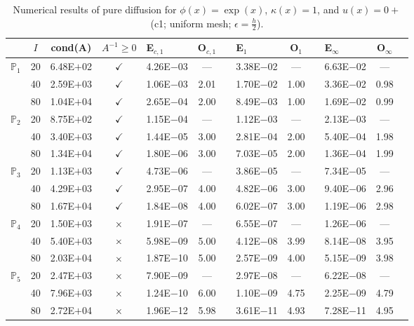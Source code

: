 \begin{table}[H]
\centering
\caption{Numerical results of pure diffusion for $\phi(x)=\exp(x)$, $\kappa(x)=1$, and $u(x)=0+$ (c1; uniform mesh; $\epsilon=\frac{h}{2}$).}
\begin{tabular}{@{}l c c c l c c l c c l c c@{}}
\toprule
 & $I$ & cond(A) & $A^{-1}\geq 0$ &  E$_{c,1}$ & O$_{c,1}$ && E$_1$ & O$_1$ && E$_{\infty}$ & O$_{\infty}$\\
\midrule
\multirow{3}{*}{$\mathbb{P}_{1}$}
 & 20 & 6.48E$+$02 & $\checkmark$ & 4.26E$-$03 & --- && 3.38E$-$02 & --- && 6.63E$-$02 & ---\\
 & 40 & 2.59E$+$03 & $\checkmark$ & 1.06E$-$03 & 2.01 && 1.70E$-$02 & 1.00 && 3.36E$-$02 & 0.98\\
 & 80 & 1.04E$+$04 & $\checkmark$ & 2.65E$-$04 & 2.00 && 8.49E$-$03 & 1.00 && 1.69E$-$02 & 0.99\\
\midrule
\multirow{3}{*}{$\mathbb{P}_{2}$}
 & 20 & 8.75E$+$02 & $\checkmark$ & 1.15E$-$04 & --- && 1.12E$-$03 & --- && 2.13E$-$03 & ---\\
 & 40 & 3.40E$+$03 & $\checkmark$ & 1.44E$-$05 & 3.00 && 2.81E$-$04 & 2.00 && 5.40E$-$04 & 1.98\\
 & 80 & 1.34E$+$04 & $\checkmark$ & 1.80E$-$06 & 3.00 && 7.03E$-$05 & 2.00 && 1.36E$-$04 & 1.99\\
\midrule
\multirow{3}{*}{$\mathbb{P}_{3}$}
 & 20 & 1.13E$+$03 & $\checkmark$ & 4.73E$-$06 & --- && 3.86E$-$05 & --- && 7.34E$-$05 & ---\\
 & 40 & 4.29E$+$03 & $\checkmark$ & 2.95E$-$07 & 4.00 && 4.82E$-$06 & 3.00 && 9.40E$-$06 & 2.96\\
 & 80 & 1.67E$+$04 & $\checkmark$ & 1.84E$-$08 & 4.00 && 6.02E$-$07 & 3.00 && 1.19E$-$06 & 2.98\\
\midrule
\multirow{3}{*}{$\mathbb{P}_{4}$}
 & 20 & 1.50E$+$03 & $\times$ & 1.91E$-$07 & --- && 6.55E$-$07 & --- && 1.26E$-$06 & ---\\
 & 40 & 5.40E$+$03 & $\times$ & 5.98E$-$09 & 5.00 && 4.12E$-$08 & 3.99 && 8.14E$-$08 & 3.95\\
 & 80 & 2.03E$+$04 & $\times$ & 1.87E$-$10 & 5.00 && 2.57E$-$09 & 4.00 && 5.15E$-$09 & 3.98\\
\midrule
\multirow{3}{*}{$\mathbb{P}_{5}$}
 & 20 & 2.47E$+$03 & $\times$ & 7.90E$-$09 & --- && 2.97E$-$08 & --- && 6.22E$-$08 & ---\\
 & 40 & 7.96E$+$03 & $\times$ & 1.24E$-$10 & 6.00 && 1.10E$-$09 & 4.75 && 2.25E$-$09 & 4.79\\
 & 80 & 2.72E$+$04 & $\times$ & 1.96E$-$12 & 5.98 && 3.61E$-$11 & 4.93 && 7.28E$-$11 & 4.95\\
\bottomrule
\end{tabular}
\end{table}